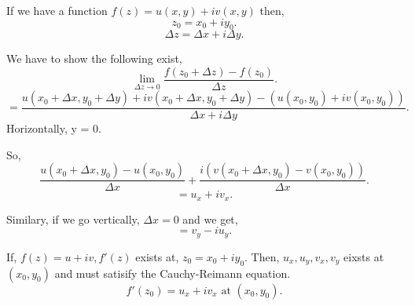 If we have a function $f(z) = u(x,y) + iv(x,y)$ then, \[
z_0 = x_0 + iy_0
.\] 
\[
\Delta z = \Delta x + i \Delta y
.\] 

We have to show the following exist, \[
\lim_{\Delta z \to 0} \frac{f(z_0 + \Delta z) - f(z_0)}{\Delta z} .\] 
\[
= \frac{u(x_0 + \Delta x, y_0 + \Delta y) + iv(x_0+\Delta x, y_0 + \Delta y) - (u(x_0,y_0) + iv(x_0,y_0))}{\Delta x + i\Delta y}
.\] 
Horizontally, \Delta y = 0.

So, 
\[\frac{u(x_0 + \Delta x, y_0) - u(x_0,y_0)}{\Delta x} + \frac{i(v(x_0 + \Delta x, y_0) - v(x_0,y_0))}{\Delta x}
.\] 
\[
 = u_x + iv_x
.\] 

Similary, if we go vertically, $\Delta x = 0$ and we get,  \[
= v_y - iu_y
.\] 


\begin{theorem}
   If, $f(z) = u + iv, f'(z)$ exists at,  $z_0 = x_0 + iy_0$. Then, $u_x, u_y, v_x, v_y$ eixsts at  $(x_0, y_0)$ and must satisify the Cauchy-Reimann equation.
   \[
      f'(z_0) = u_x + iv_x \text { at } (x_0,y_0)
   .\] 
\end{theorem}

